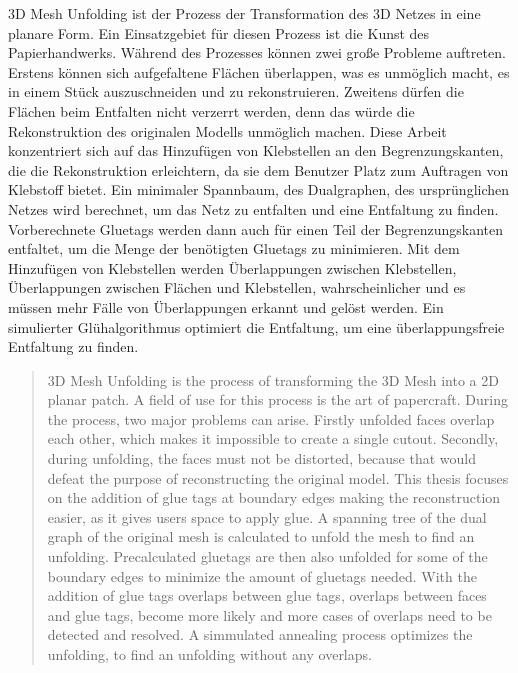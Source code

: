 \documentclass[draft,final]{vutinfth} %
\begin{document}
\begin{kurzfassung}
3D Mesh Unfolding ist der Prozess der Transformation des 3D Netzes in eine planare Form. Ein Einsatzgebiet für diesen Prozess ist die Kunst des Papierhandwerks. Während des Prozesses können zwei große Probleme auftreten. Erstens können sich aufgefaltene Flächen überlappen, was es unmöglich macht, es in einem Stück auszuschneiden und zu rekonstruieren. Zweitens dürfen die Flächen beim Entfalten nicht verzerrt werden, denn das würde die Rekonstruktion des originalen Modells unmöglich machen. Diese Arbeit konzentriert sich auf das Hinzufügen von Klebstellen an den Begrenzungskanten, die die Rekonstruktion erleichtern, da sie dem Benutzer Platz zum Auftragen von Klebstoff bietet. 
Ein minimaler Spannbaum, des Dualgraphen, des ursprünglichen Netzes wird berechnet, um das Netz zu entfalten und eine Entfaltung zu finden. Vorberechnete Gluetags werden dann auch für einen Teil der Begrenzungskanten entfaltet, um die Menge der benötigten Gluetags zu minimieren. Mit dem Hinzufügen von Klebstellen werden Überlappungen zwischen Klebstellen, Überlappungen zwischen Flächen und Klebstellen, wahrscheinlicher und es müssen mehr Fälle von Überlappungen erkannt und gelöst werden. Ein simulierter Glühalgorithmus optimiert die Entfaltung, um eine überlappungsfreie Entfaltung zu finden.
\end{kurzfassung}

\begin{abstract}
3D Mesh Unfolding is the process of transforming the 3D Mesh into a 2D planar patch. A field of use for this process is the art of papercraft. During the process, two major problems can arise. Firstly unfolded faces overlap each other, which makes it impossible to create a single cutout. Secondly, during unfolding, the faces must not be distorted, because that would defeat the purpose of reconstructing the original model. This thesis focuses on the addition of glue tags at boundary edges making the reconstruction easier, as it gives users space to apply glue. 
A spanning tree of the dual graph of the original mesh is calculated to unfold the mesh to find an unfolding. Precalculated gluetags are then also unfolded for some of the boundary edges to minimize the amount of gluetags needed. With the addition of glue tags overlaps between glue tags, overlaps between faces and glue tags, become more likely and more cases of overlaps need to be detected and resolved. A simmulated annealing process optimizes the unfolding, to find an unfolding without any overlaps.
\end{abstract}
\end{document}
